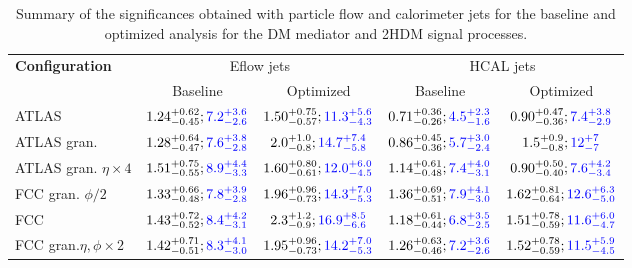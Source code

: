 \begin{table}[h]
	\caption{Summary of the significances obtained with particle flow and calorimeter jets for the baseline and optimized analysis for the DM mediator and 2HDM signal processes.}
	\label{table:sum_DM}
	\centering
	\begin{tabular}{lcccc}
		\hline
		\multirow{2}{*}{\textbf{Configuration}} & \multicolumn{2}{c}{Eflow jets}    & \multicolumn{2}{c}{HCAL jets} \\ \cline{2-5} 
		& Baseline & Optimized & Baseline  & Optimized           \\ \midrule \midrule
		ATLAS& $1.24^{+0.62}_{-0.45};\textcolor{blue}{7.2^{+3.6}_{-2.6}}$& $1.50^{+0.75}_{-0.57};\textcolor{blue}{11.3^{+5.6}_{-4.3}}$  & $0.71^{+0.36}_{-0.26};\textcolor{blue}{4.5^{+2.3}_{-1.6}}$  & $0.90^{+0.47}_{-0.36};\textcolor{blue}{7.4^{+3.8}_{-2.9}}$           \\ 
		\rowcolor{black!7}ATLAS gran.& $1.28^{+0.64}_{-0.47};\textcolor{blue}{7.6^{+3.8}_{-2.8}}$ & $2.0^{+1.0}_{-0.8};\textcolor{blue}{14.7^{+7.4}_{-5.8}}$ & $0.86^{+0.45}_{-0.36};\textcolor{blue}{5.7^{+3.0}_{-2.4}}$ & $1.5^{+0.9}_{-0.8};\textcolor{blue}{12^{+7}_{-7}}$          \\ 
		ATLAS gran. $\eta\times 4$& $1.51^{+0.75}_{-0.55};\textcolor{blue}{8.9^{+4.4}_{-3.3}}$ & $1.60^{+0.80}_{-0.61};\textcolor{blue}{12.0^{+6.0}_{-4.5}}$ & $1.14^{+0.61}_{-0.48};\textcolor{blue}{7.4^{+4.0}_{-3.1}}$& $0.90^{+0.50}_{-0.40};\textcolor{blue}{7.6^{+4.2}_{-3.4}}$    \\ 
		\rowcolor{black!7}FCC gran. $\phi/2$& $1.33^{+0.66}_{-0.48};\textcolor{blue}{7.8^{+3.9}_{-2.8}}$ & $1.96^{+0.96}_{-0.73};\textcolor{blue}{14.3^{+7.0}_{-5.3}}$ & $1.36^{+0.69}_{-0.51};\textcolor{blue}{7.9^{+4.1}_{-3.0}}$ & $1.62^{+0.81}_{-0.64};\textcolor{blue}{12.6^{+6.3}_{-5.0}}$           \\ 
		FCC& $1.43^{+0.72}_{-0.52};\textcolor{blue}{8.4^{+4.2}_{-3.1}}$ & $2.3^{+1.2}_{-0.9};\textcolor{blue}{16.9^{+8.5}_{-6.6}}$ & $1.18^{+0.61}_{-0.44};\textcolor{blue}{6.8^{+3.5}_{-2.5}}$ & $1.51^{+0.78}_{-0.59};\textcolor{blue}{11.6^{+6.0}_{-4.7}}$           \\ 
		\rowcolor{black!7}FCC gran.$\eta,\phi \times 2$& $1.42^{+0.71}_{-0.51};\textcolor{blue}{8.3^{+4.1}_{-3.0}}$ & $1.95^{+0.96}_{-0.73};\textcolor{blue}{14.2^{+7.0}_{-5.3}}$ & $1.26^{+0.63}_{-0.46};\textcolor{blue}{7.2^{+3.6}_{-2.6}}$ & $1.52^{+0.78}_{-0.59};\textcolor{blue}{11.5^{+5.9}_{-4.5}}$ \\ \bottomrule
	\end{tabular}
	
\end{table}

